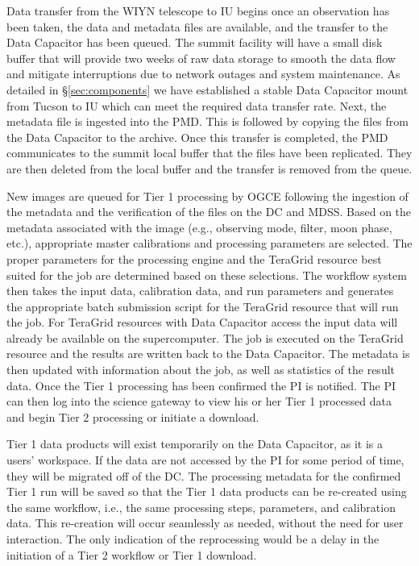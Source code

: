 \documentclass[10pt,conference]{IEEEtran}
\begin{document}
Data transfer from the WIYN telescope to IU begins once an observation has been taken, the data and metadata files are available, and the transfer to the Data Capacitor has been queued. 
The summit facility will have a small disk buffer that will provide two weeks of raw data storage to smooth the data flow and mitigate interruptions due to network outages and system maintenance. As detailed in \S\ref{sec:components} we have established a stable Data Capacitor mount from Tucson to IU which can meet the required data transfer rate. Next, the metadata file is ingested into the PMD. This is followed by copying the files from the Data Capacitor to the archive. Once this transfer is completed, the PMD communicates to the summit local buffer that the files have been replicated. They are then deleted from the local buffer and the transfer is removed from the queue.

New images are queued for Tier 1 processing by OGCE following the ingestion of the metadata and the verification of the files on the DC and MDSS. 
Based on the metadata associated with the image (e.g., observing mode, filter, moon phase, etc.), appropriate master calibrations and processing parameters are selected. The proper parameters for the processing engine and the TeraGrid resource best suited for the job are determined based on these selections. The workflow system then takes the input data, calibration data, and run parameters and generates the appropriate batch submission script for the TeraGrid resource that will run the job. For TeraGrid resources with Data Capacitor access the input data will already be available on the supercomputer. The job is executed on the TeraGrid resource and the results are written back to the Data Capacitor. The metadata is then updated with information about the job, as well as statistics of the result data. Once the Tier 1 processing has been confirmed the PI is notified. The PI can then log into the science gateway to view his or her Tier 1 processed data and begin Tier 2 processing or initiate a download.

Tier 1 data products will exist temporarily on the Data Capacitor, as it is a users' workspace. If the data are not accessed by the PI for some period of time, they will be migrated off of the DC. The processing metadata for the confirmed Tier 1 run will be saved so that the Tier 1 data products can be re-created using the same workflow, i.e., the same processing steps, parameters, and calibration data. This re-creation will occur seamlessly as needed, without the need for user interaction. The only indication of the reprocessing would be a delay in the initiation of a Tier 2 workflow or Tier 1 download.
\end{document}
